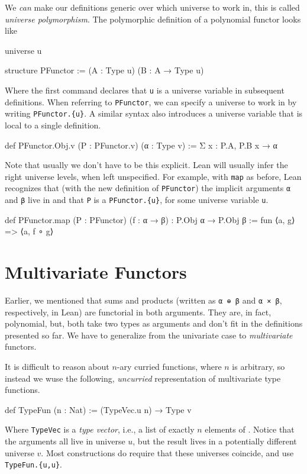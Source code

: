 \documentclass[titlepage]{report}
\newcommand\Typen[1]{\lean{Type #1}}
\begin{document}
We \emph{can} make our definitions generic over which universe to work in, this is called \emph{universe polymorphism}. The polymorphic definition of a polynomial functor looks like
\begin{leancode}
    universe u

    structure PFunctor := (A : Type u) (B : A → Type u)
\end{leancode}
Where the first command declares that \texttt{u} is a universe variable in subsequent definitions.
When referring to \texttt{PFunctor}, we can specify a universe to work in by writing \texttt{PFunctor.\{u\}}. A similar syntax also introduces a universe variable that is local to a single definition.

\begin{leancode}
    def PFunctor.Obj.{v} (P : PFunctor.{v}) (α : Type v)
        := Σ x : P.A, P.B x → α
\end{leancode}

Note that usually we don't have to be this explicit. Lean will usually infer the right universe levels, when left unspecified.
For example, with \texttt{map} as before, Lean recognizes that (with the new definition of \texttt{PFunctor}) the implicit arguments \texttt{α} and \texttt{β} live in \Typen{u} and that \texttt{P} is a \texttt{PFunctor.\{u\}}, for some universe variable \texttt{u}.
\begin{leancode}
    def PFunctor.map (P : PFunctor) (f : α → β) : P.Obj α → P.Obj β 
        := fun ⟨a, g⟩ => ⟨a, f ∘ g⟩    
\end{leancode}


\section{Multivariate Functors}
Earlier, we mentioned that sums and products (written as \texttt{α ⊕ β} and \texttt{α × β}, respectively, in Lean) are functorial in both arguments.
They are, in fact, polynomial, but, both take two types as arguments and don't fit in the definitions presented so far. We have to generalize from the univariate case to \emph{multivariate} functors.

It is difficult to reason about $n$-ary curried functions, where $n$ is arbitrary, so instead we wuse the following, \emph{uncurried} representation of multivariate type functions.

\begin{leancode}
    def TypeFun (n : Nat) := (TypeVec.{u} n) → Type v
\end{leancode}
Where \texttt{TypeVec} is a \emph{type vector}, i.e., a list of exactly $n$ elements of \Typen{u}.
Notice that the arguments all live in universe $u$, but the result lives in a potentially different universe $v$. 
Most constructions do require that these universes coincide, and use \texttt{TypeFun.\{u,u\}}.
\end{document}
